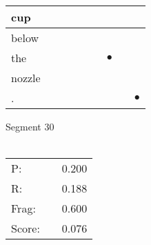 \documentclass[landscape]{article}
\newcommand{\ssp}{\hspace{2pt}}
\newcommand{\mex}{\cellcolor{g}$\bullet$}
\begin{document}
\begin{tabular}{|l|p{10pt}|p{10pt}|p{10pt}|p{10pt}|p{10pt}|p{10pt}|p{10pt}|p{10pt}|}
\hline
\ssp cup \ssp&\hspace{2pt}&\hspace{2pt}&\hspace{2pt}&\hspace{2pt}&\hspace{2pt}&\hspace{2pt}&\hspace{2pt}&\hspace{2pt}\\
\hline
\ssp below \ssp&\hspace{2pt}&\hspace{2pt}&\hspace{2pt}&\hspace{2pt}&\hspace{2pt}&\hspace{2pt}&\hspace{2pt}&\hspace{2pt}\\
\hline
\ssp \cellcolor{ref5}the \ssp&\hspace{2pt}&\hspace{2pt}&\hspace{2pt}&\hspace{2pt}&\hspace{2pt}&\hspace{2pt}\mex&\hspace{2pt}&\hspace{2pt}\\
\hline
\ssp nozzle \ssp&\hspace{2pt}&\hspace{2pt}&\hspace{2pt}&\hspace{2pt}&\hspace{2pt}&\hspace{2pt}&\hspace{2pt}&\hspace{2pt}\\
\hline
\ssp \cellcolor{ref7}. \ssp&\hspace{2pt}&\hspace{2pt}&\hspace{2pt}&\hspace{2pt}&\hspace{2pt}&\hspace{2pt}&\hspace{2pt}&\hspace{2pt}\mex\\
\hline
\end{tabular}

\vspace{6pt}
\noindent Segment 30\\\\
\noindent\begin{tabular}{lm{12pt}r}
\hline
P:&&0.200\\
R:&&0.188\\
Frag:&&0.600\\
Score:&&0.076\\
\end{tabular}
\end{document}
